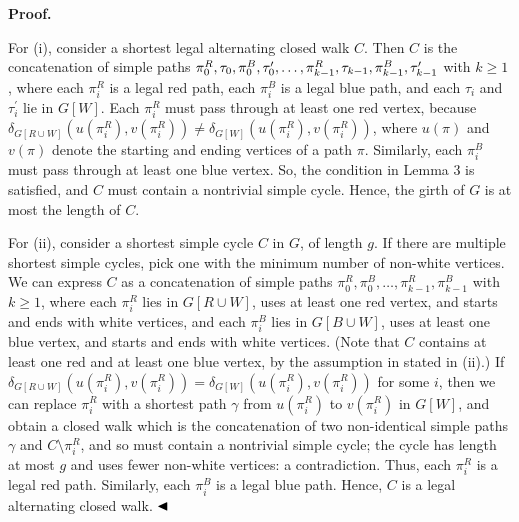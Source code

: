 \par\medskip\noindent\textbf{Proof.}\par
For (i), consider a shortest legal alternating closed walk $C$. Then $C$ is the concatenation of simple paths $\pi^{R}_{0},\tau_{0},\pi^{B}_{0},\tau^{\prime}_{0},\ldots,\pi^{R}_{k-1},\tau_{%
k-1},\pi^{B}_{k-1},\tau^{\prime}_{k-1}$ with $k\geq 1$, where each $\pi^{R}_{i}$ is a legal red path, each $\pi^{B}_{i}$ is a legal blue path, and each $\tau_{i}$ and $\tau^{\prime}_{i}$ lie in $G[W]$. Each $\pi^{R}_{i}$ must pass through at least one red vertex, because $\delta_{G[R\cup W]}(u(\pi^{R}_{i}),v(\pi^{R}_{i}))\neq\delta_{G[W]}(u(\pi^{R}_%
{i}),v(\pi^{R}_{i}))$, where $u(\pi)$ and $v(\pi)$ denote the starting and ending vertices of a path $\pi$. Similarly, each $\pi^{B}_{i}$ must pass through at least one blue vertex. So, the condition in Lemma 3 is satisfied, and $C$ must contain a nontrivial simple cycle. Hence, the girth of $G$ is at most the length of $C$.
\par
\par
For (ii), consider a shortest simple cycle $C$ in $G$, of length $g$. If there are multiple shortest simple cycles, pick one with the minimum number of non-white vertices. We can express $C$ as a concatenation of simple paths $\pi^{R}_{0},\pi^{B}_{0},\ldots,\pi^{R}_{k-1},\pi^{B}_{k-1}$ with $k\geq 1$, where each $\pi^{R}_{i}$ lies in $G[R\cup W]$, uses at least one red vertex, and starts and ends with white vertices, and each $\pi^{B}_{i}$ lies in $G[B\cup W]$, uses at least one blue vertex, and starts and ends with white vertices. (Note that $C$ contains at least one red and at least one blue vertex, by the assumption in stated in (ii).) If $\delta_{G[R\cup W]}(u(\pi^{R}_{i}),v(\pi^{R}_{i}))=\delta_{G[W]}(u(\pi^{R}_{i}%
),v(\pi^{R}_{i}))$ for some $i$, then we can replace $\pi^{R}_{i}$ with a shortest path $\gamma$ from $u(\pi^{R}_{i})$ to $v(\pi^{R}_{i})$ in $G[W]$, and obtain a closed walk which is the concatenation of two non-identical simple paths $\gamma$ and $C\setminus\pi_{i}^{R}$, and so must contain a nontrivial simple cycle; the cycle has length at most $g$ and uses fewer non-white vertices: a contradiction. Thus, each $\pi^{R}_{i}$ is a legal red path. Similarly, each $\pi^{B}_{i}$ is a legal blue path. Hence, $C$ is a legal alternating closed walk. $\hfill\blacktriangleleft$
\par
\par

